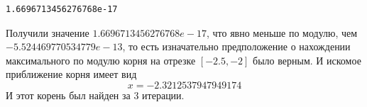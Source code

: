 \documentclass[11pt]{article}
\makeatletter
\newcommand{\boxspacing}{\kern\kvtcb@left@rule\kern\kvtcb@boxsep}
\newcommand{\prompt}[4]{
        {\ttfamily\llap{{\color{#2}[#3]:\hspace{3pt}#4}}\vspace{-\baselineskip}}
    }
\makeatother
\begin{document}
            \begin{tcolorbox}[breakable, size=fbox, boxrule=.5pt, pad at break*=1mm, opacityfill=0]
\prompt{Out}{outcolor}{66}{\boxspacing}
\begin{Verbatim}[commandchars=\\\{\}]
1.6696713456276768e-17
\end{Verbatim}
\end{tcolorbox}
        
    Получили значение \(1.6696713456276768e-17\), что явно меньше по модулю,
чем \(-5.524469770534779e-13\), то есть изначательно предположение о
нахождении максимального по модулю корня на отрезке \([-2.5, -2]\) было
верным. И искомое приближение корня имеет вид\[x = -2.3212537947949174\] И этот корень был найден за 3 итерации.
\end{document}
